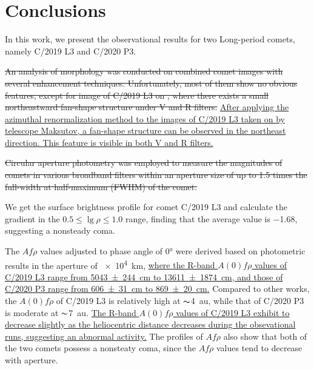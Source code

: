 \section{Conclusions} \label{sec:con}
In this work, we present the observational results for two Long-period comets, namely C/2019 L3 and C/2020 P3. 

\st{An analysis of morphology was conducted on combined comet images with several enhancement techniques. Unfortunately, most of them show no obvious features, except for image of C/2019 L3 on , where there exists a small northeastward fan-shape structure under V and R filters. }\ul{After applying the azimuthal renormalization method to the images of C/2019 L3 taken on  by telescope Maksutov, a fan-shape structure can be observed in the northeast direction. This feature is visible in both V and R filters. 
}

\st{Circular aperture photometry was employed to measure the magnitudes of comets in various broadband filters within an aperture size of up to 1.5 times the full-width at half-maximum (FWHM) of the comet. }

We get the surface brightness profile for comet C/2019 L3 and calculate the gradient in the $0.5 \leqslant \lg{\rho} \leqslant 1.0$ range, finding that the average value is \num{-1.68}, suggesting a nonsteady coma. 

The $Af\rho$ values adjusted to phase angle of \ang{0} were derived based on photometric results in the aperture of \SI{e4}{\km}, \ul{where the R-band $A(0)f\rho$ values of C/2019 L3 range from {\SI{5043 +- 244}{\cm}} to {\SI{13611 +- 1874}{\cm}}, and those of C/2020 P3 range from {\SI{606 +- 31}{\cm}} to {\SI{869 +- 20}{\cm}}.}
Compared to other works, the $A(0)f\rho$ of C/2019 L3 is relatively high at $\thicksim${\SI{4}{\astronomicalunit}}, while that of C/2020 P3 is moderate at $\thicksim${\SI{7}{\astronomicalunit}}. \ul{The R-band $A(0)f\rho$ values of C/2019 L3 exhibit to decrease slightly as the heliocentric distance decreases during the obsevational runs, suggesting an abnormal activity.} The profiles of $Af\rho$ also show that both of the two comets possess a nonsteaty coma, since the $Af\rho$ values tend to decrease with aperture. 

